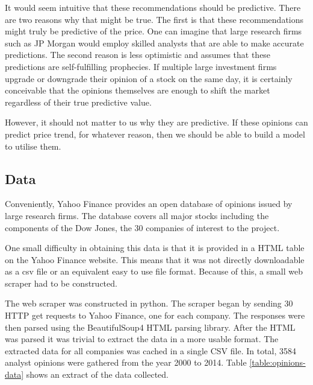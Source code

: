 \documentclass{report}
\begin{document}
It would seem intuitive that these recommendations should be predictive. There are two reasons why that might be true. The first is that these recommendations might truly be predictive of the price. One can imagine that large research firms such as JP Morgan would employ skilled analysts that are able to make accurate predictions. The second reason is less optimistic and assumes that these predictions are self-fulfilling prophecies. If multiple large investment firms upgrade or downgrade their opinion of a stock on the same day, it is certainly conceivable that the opinions themselves are enough to shift the market regardless of their true predictive value.

However, it should not matter to us why they are predictive. If these opinions can predict price trend, for whatever reason, then we should be able to build a model to utilise them.

\subsection{Data}

Conveniently, Yahoo Finance provides an open database of opinions issued by large research firms. The database covers all major stocks including the components of the Dow Jones, the 30 companies of interest to the project. 

One small difficulty in obtaining this data is that it is provided in a HTML table on the Yahoo Finance website. This means that it was not directly downloadable as a csv file or an equivalent easy to use file format. Because of this, a small web scraper had to be constructed. 

The web scraper was constructed in python. The scraper began by sending 30 HTTP get requests to Yahoo Finance, one for each company. The responses were then parsed using the BeautifulSoup4 HTML parsing library. After the HTML was parsed it was trivial to extract the data in a more usable format. The extracted data for all companies was cached in a single CSV file. In total, 3584 analyst opinions were gathered from the year 2000 to 2014. Table \ref{table:opinions-data} shows an extract of the data collected.
\end{document}
